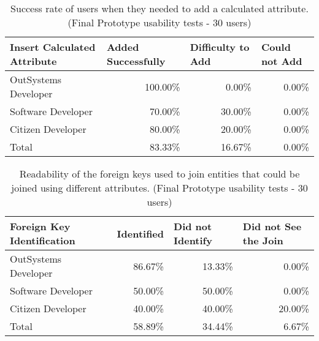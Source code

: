 \begin{table}[tb]
  \caption{Success rate of users when they needed to add a calculated attribute. (Final Prototype usability tests - 30 users)}
    \label{tab:finalPrototypeCalculatedAttribute}
  \begin{tabular}{@{}lrrr@{}}
  \toprule
  \textbf{Insert Calculated Attribute} & \multicolumn{1}{l}{Added Successfully} & \multicolumn{1}{l}{Difficulty to Add} & \multicolumn{1}{l}{Could not Add} \\ \midrule
  OutSystems Developer                 & 100.00\%                               & 0.00\%                                & 0.00\%                            \\
  Software Developer                   & 70.00\%                                & 30.00\%                               & 0.00\%                            \\
  Citizen Developer                    & 80.00\%                                & 20.00\%                               & 0.00\%                            \\
  Total                                & 83.33\%                                & 16.67\%                               & 0.00\%                            \\ \bottomrule
  \end{tabular}
  \end{table}





\begin{table}[tb]
  \caption{Readability of the foreign keys used to join entities that could be joined using different attributes. (Final Prototype usability tests - 30 users)}
    \label{tab:finalPrototypeForeignKeyIdentification}
  \begin{tabular}{@{}lrrr@{}}
  \toprule
  \textbf{Foreign Key Identification} & \multicolumn{1}{l}{Identified} & \multicolumn{1}{l}{Did not Identify} & \multicolumn{1}{l}{Did not See the Join} \\ \midrule
  OutSystems Developer                & 86.67\%                        & 13.33\%                              & 0.00\%                                   \\
  Software Developer                  & 50.00\%                        & 50.00\%                              & 0.00\%                                   \\
  Citizen Developer                   & 40.00\%                        & 40.00\%                              & 20.00\%                                  \\
  Total                               & 58.89\%                        & 34.44\%                              & 6.67\%                                   \\ \bottomrule
  \end{tabular}
  \end{table}

